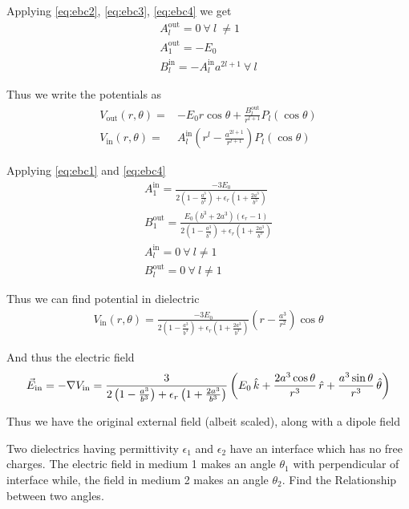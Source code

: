 \documentclass[../main.tex]{subfiles}
\begin{document}
\begin{questions}
\begin{solution}
	Applying \eqref{eq:ebc2}, \eqref{eq:ebc3}, \eqref{eq:ebc4} we get
	\begin{gather}
		A_l^\text{out} = 0\ \forall\ l\ \neq 1\\
		A_1^\text{out} = -E_0\\
		B_l^\text{in} = -A_l^\text{in}a^{2l+1}\ \forall\ l
	\end{gather}

	Thus we write the potentials as
	\begin{align}
		V_\text{out}(r,\theta) =& -E_0r\cos\theta + \frac{B^\text{out}_l}{r^{l+1}}P_l(\cos\theta)
		\\
		V_\text{in}(r,\theta) =& A^\text{in}_l\left(r^l-\frac{a^{2l+1}}{r^{l+1}}\right)P_l(\cos\theta)
	\end{align}

	Applying \eqref{eq:ebc1} and \eqref{eq:ebc4}
	\begin{gather}
		A_1^\text{in} = \frac{-3E_0}{2\left(1-\frac{a^3}{b^3}\right)+\epsilon_r\left(1+\frac{2a^3}{b^3}\right)}
		\\
		B_1^\text{out} = \frac{E_0(b^3+2a^3)(\epsilon_r-1)}{2\left(1-\frac{a^3}{b^3}\right)+\epsilon_r\left(1+\frac{2a^3}{b^3}\right)}
		\\
		A_l^\text{in} = 0 \ \forall\ l \neq 1
		\\
		B_l^\text{out} = 0 \ \forall\ l \neq 1
	\end{gather}

	Thus we can find potential in dielectric
	\begin{gather}
		V_\text{in}(r,\theta) = \frac{-3E_0}{2\left(1-\frac{a^3}{b^3}\right)+\epsilon_r\left(1+\frac{2a^3}{b^3}\right)}\left(r-\frac{a^3}{r^2}\right)\cos\theta
	\end{gather}

	And thus the electric field
	\begin{gather}
		\vec{E}_\text{in} = -\nabla V_\text{in} = \frac{3}{2\left(1-\frac{a^3}{b^3}\right)+\epsilon_r\left(1+\frac{2a^3}{b^3}\right)}\left(E_0\,\hat{k}+\frac{2a^3\cos\theta}{r^3}\,\hat{r}+\frac{a^3\sin\theta}{r^3}\,\hat{\theta}\right)
	\end{gather}

	Thus we have the original external field (albeit scaled), along with a dipole field
\end{solution}

\question Two dielectrics having permittivity $\epsilon_1$ and $\epsilon_2$ have an interface which has no free charges. The electric field in medium 1 makes an angle $\theta_1$ with perpendicular of interface while, the field in medium 2 makes an angle $\theta_2$. Find the Relationship between two angles.
\begin{center}
\end{center}
\end{questions}
\end{document}
